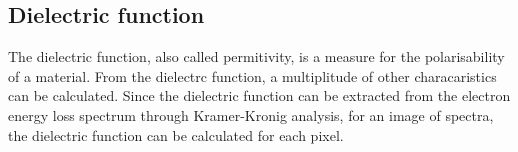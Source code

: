 \subsection{Dielectric function}

The dielectric function, also called permitivity, is a measure for the polarisability of a material. From the dielectrc function, a multiplitude of other characaristics can be calculated. Since the dielectric function can be extracted from the electron energy loss spectrum through Kramer-Kronig analysis, for an image of spectra, the dielectric function can be calculated for each pixel. \cite{egerton_book}